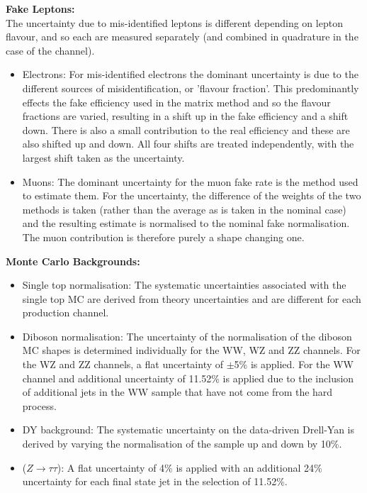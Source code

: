 \vspace{5mm}

\noindent
\textbf{Fake Leptons:}\\
The uncertainty due to mis-identified leptons is different depending on lepton flavour, and so each are measured separately (and combined in quadrature in the case of the \emu channel). 

\begin{itemize}
    \item Electrons: For mis-identified electrons the dominant uncertainty is due to the different sources of misidentification, or 'flavour fraction'. This predominantly effects the fake efficiency used in the matrix method and so the flavour fractions are varied, resulting in a shift up in the fake efficiency and a shift down. There is also a small contribution to the real efficiency and these are also shifted up and down. All four shifts are treated independently, with the largest shift taken as the uncertainty.
    \item Muons: The dominant uncertainty for the muon fake rate is the method used to estimate them. For the uncertainty, the difference of the weights of the two methods is taken (rather than the average as is taken in the nominal case) and the resulting estimate is normalised to the nominal fake normalisation. The muon contribution is therefore purely a shape changing one.
\end{itemize}

\vspace{5mm}
\noindent
\textbf{Monte Carlo Backgrounds:}
\begin{itemize}
    \item Single top normalisation: The systematic uncertainties associated with the single top MC are derived from theory uncertainties and are different for each production channel. 
    \item Diboson normalisation: The uncertainty of the normalisation of the diboson MC shapes is determined individually for the WW, WZ and ZZ channels. For the WZ and ZZ channels, a flat uncertainty of $\pm$5\% is applied. For the WW channel and additional uncertainty of 11.52\% is applied due to the inclusion of additional jets in the WW sample that have not come from the hard process. 
    \item DY background: The systematic uncertainty on the data-driven Drell-Yan is derived by varying the normalisation of the sample up and down by 10\%.%
    \item ($Z\rightarrow\tau\tau$): A flat uncertainty of 4\% is applied with an additional 24\% uncertainty for each final state jet in the selection of 11.52\%.
\end{itemize}

